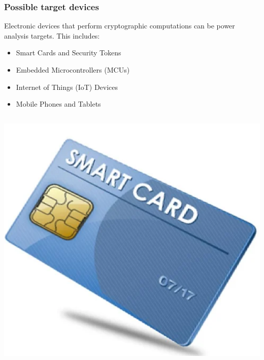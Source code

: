 \begin{frame}
    \frametitle{Possible target devices}

    Electronic devices that perform cryptographic computations can be power analysis targets. This includes:
    \begin{itemize}
        \item Smart Cards and Security Tokens
        \item Embedded Microcontrollers (MCUs)
        \item Internet of Things (IoT) Devices
        \item Mobile Phones and Tablets
    \end{itemize}
    \begin{columns}[T] %
        \begin{column}{0.40\textwidth}
            \centering
            \includegraphics[width=\linewidth]{main thing/Pictures/smartcard.png}
        \end{column}
        

\end{columns}
\end{frame}
